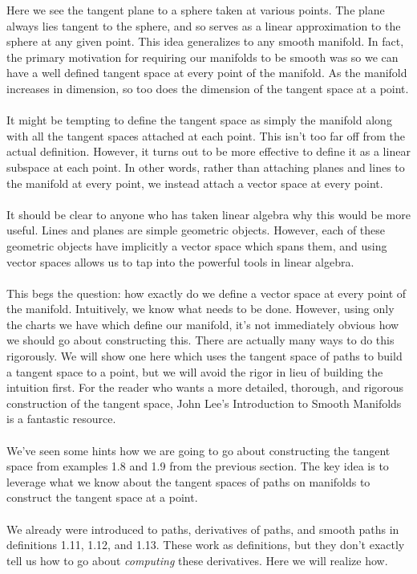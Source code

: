 \documentclass[]{article}
\newcommand\<{\ensuremath{\left\langle}}
\renewcommand\>{\ensuremath{\right\rangle}}
\theoremstyle{definition}
\theoremstyle{definition}
\begin{document}
	Here we see the tangent plane to a sphere taken at various points. The plane always lies tangent to the sphere, and so serves as a linear approximation to the sphere at any given point. This idea generalizes to any smooth manifold. In fact, the primary motivation for requiring our manifolds to be smooth was so we can have a well defined tangent space at every point of the manifold. As the manifold increases in dimension, so too does the dimension of the tangent space at a point.\\
	\\
	It might be tempting to define the tangent space as simply the manifold along with all the tangent spaces attached at each point. This isn't too far off from the actual definition. However, it turns out to be more effective to define it as a linear subspace at each point. In other words, rather than attaching planes and lines to the manifold at every point, we instead attach a vector space at every point.\\
	\\
	It should be clear to anyone who has taken linear algebra why this would be more useful. Lines and planes are simple geometric objects. However, each of these geometric objects have implicitly a vector space which spans them, and using vector spaces allows us to tap into the powerful tools in linear algebra.\\
	\\
	This begs the question: how exactly do we define a vector space at every point of the manifold. Intuitively, we know what needs to be done. However, using only the charts we have which define our manifold, it's not immediately obvious how we should go about constructing this. There are actually many ways to do this rigorously. We will show one here which uses the tangent space of paths to build a tangent space to a point, but we will avoid the rigor in lieu of building the intuition first. For the reader who wants a more detailed, thorough, and rigorous construction of the tangent space, John Lee's Introduction to Smooth Manifolds is a fantastic resource.\\
	\\
	We've seen some hints how we are going to go about constructing the tangent space from examples 1.8 and 1.9 from the previous section. The key idea is to leverage what we know about the tangent spaces of paths on manifolds to construct the tangent space at a point.\\
	\\
	We already were introduced to paths, derivatives of paths, and smooth paths in definitions 1.11, 1.12, and 1.13. These work as definitions, but they don't exactly tell us how to go about \textit{computing} these derivatives. Here we will realize how.
\end{document}
